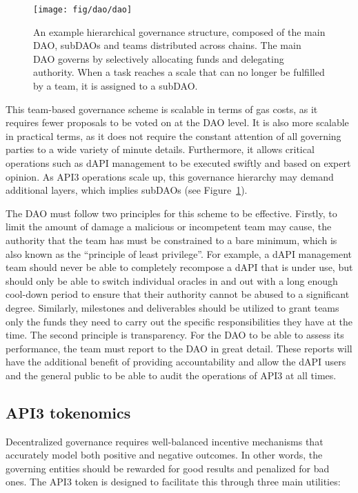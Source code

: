 \documentclass[11pt]{article}
\begin{document}
\begin{figure}[t]
    \centering
	\texttt{[image: fig/dao/dao]}
	\caption{An example hierarchical governance structure, composed of the main DAO, subDAOs and teams distributed across chains.
	The main DAO governs by selectively allocating funds and delegating authority.
	When a task reaches a scale that can no longer be fulfilled by a team, it is assigned to a subDAO.}
	\label{fig:dao}
\end{figure}

This team-based governance scheme is scalable in terms of gas costs, as it requires fewer proposals to be voted on at the DAO level.
It is also more scalable in practical terms, as it does not require the constant attention of all governing parties to a wide variety of minute details.
Furthermore, it allows critical operations such as dAPI management to be executed swiftly and based on expert opinion.
As API3 operations scale up, this governance hierarchy may demand additional layers, which implies subDAOs (see Figure~\ref{fig:dao}).

The DAO must follow two principles for this scheme to be effective.
Firstly, to limit the amount of damage a malicious or incompetent team may cause, the authority that the team has must be constrained to a bare minimum, which is also known as the ``principle of least privilege''.
For example, a dAPI management team should never be able to completely recompose a dAPI that is under use, but should only be able to switch individual oracles in and out with a long enough cool-down period to ensure that their authority cannot be abused to a significant degree.
Similarly, milestones and deliverables should be utilized to grant teams only the funds they need to carry out the specific responsibilities they have at the time.
The second principle is transparency.
For the DAO to be able to assess its performance, the team must report to the DAO in great detail.
These reports will have the additional benefit of providing accountability and allow the dAPI users and the general public to be able to audit the operations of API3 at all times.

\subsection{API3 tokenomics}
\label{sec:api3-tokenomics}

Decentralized governance requires well-balanced incentive mechanisms that accurately model both positive and negative outcomes.
In other words, the governing entities should be rewarded for good results and penalized for bad ones.
The API3 token is designed to facilitate this through three main utilities:
\end{document}
